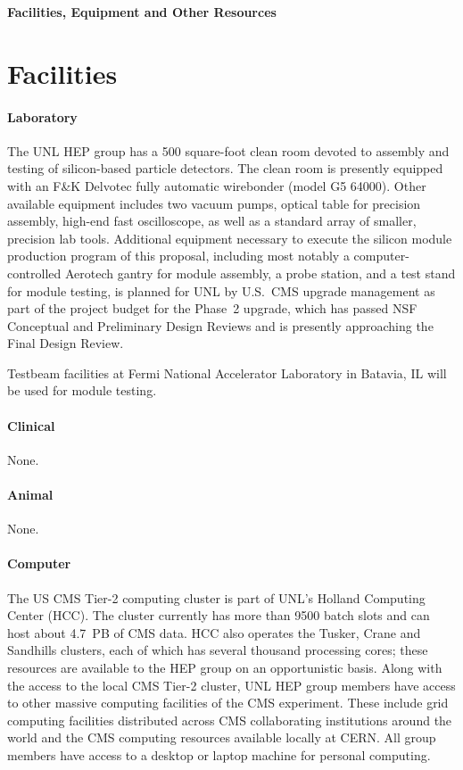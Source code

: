 \documentclass[11pt]{article}
\begin{document}
\begin{center}
{\large \bf Facilities, Equipment and Other Resources}\\
\end{center}


\section{Facilities}

\paragraph{Laboratory} The UNL HEP group has a 500 square-foot clean room devoted to assembly and testing of silicon-based particle detectors. The clean room is presently equipped with an F\&K Delvotec fully automatic wirebonder (model G5 64000). Other available equipment includes two vacuum pumps, optical table for precision assembly, high-end fast oscilloscope, as well as a standard array of smaller, precision lab tools. Additional equipment necessary to execute the silicon module production program of this proposal, including most notably a computer-controlled Aerotech gantry for module assembly, a probe station, and a test stand for module testing, is planned for UNL by U.S.~CMS upgrade management as part of the project budget for the Phase~2 upgrade, which has passed NSF Conceptual and Preliminary Design Reviews and is presently approaching the Final Design Review.

Testbeam facilities at Fermi National Accelerator Laboratory in Batavia, IL will be used for module testing.

\paragraph{Clinical} None.

\paragraph{Animal} None.

\paragraph{Computer} The US CMS Tier-2 computing cluster is part of UNL's
Holland Computing Center (HCC).  The cluster currently has more than 9500 batch slots and can host about 4.7~PB of CMS data.
HCC also operates the Tusker, Crane and Sandhills clusters, each of which has several thousand
processing cores; these resources are available to the HEP group on an
opportunistic basis. Along with the access to the local CMS Tier-2 cluster, UNL HEP group members have access to other massive computing facilities
of the CMS experiment. These include grid computing facilities distributed
across CMS collaborating institutions around the world and the CMS
computing resources available locally at CERN.  All group members have access to a 
desktop or laptop machine for personal computing.
\end{document}
